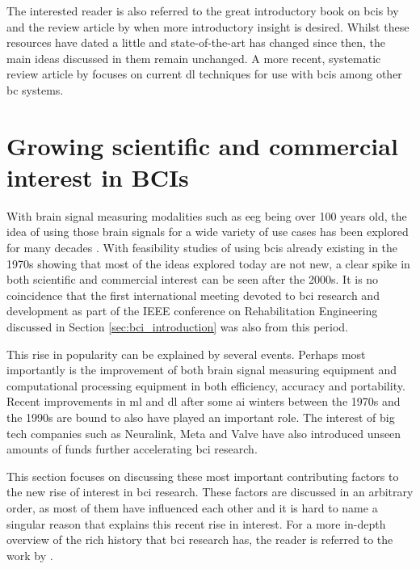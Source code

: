 The interested reader is also referred to the great introductory book on \glspl{bci} by \citet{bci_book} and the review article by \citet{bci_review} when more introductory insight is desired.
Whilst these resources have dated a little and state-of-the-art has changed since then, the main ideas discussed in them remain unchanged.
A more recent, systematic review article by \citet{bci_review_arnau} focuses on current \gls{dl} techniques for use with \glspl{bci} among other \gls{bc} systems.



\section{Growing scientific and commercial interest in BCIs}
\label{sec:bci_gaining_popularity}

With brain signal measuring modalities such as \gls{eeg} being over 100 years old, the idea of using those brain signals for a wide variety of use cases has been explored for many decades \citep{human_eeg_discovery, first_eeg, bci_history}.
With feasibility studies of using \glspl{bci} already existing in the 1970s \citep[for example by][]{early_bci} showing that most of the ideas explored today are not new, a clear spike in both scientific and commercial interest can be seen after the 2000s.
It is no coincidence that the first international meeting devoted to \gls{bci} research and development as part of the IEEE conference on Rehabilitation Engineering discussed in Section \ref{sec:bci_introduction} was also from this period.

This rise in popularity can be explained by several events.
Perhaps most importantly is the improvement of both brain signal measuring equipment and computational processing equipment in both efficiency, accuracy and portability.
Recent improvements in \gls{ml} and \gls{dl} after some \gls{ai} winters between the 1970s and the 1990s are bound to also have played an important role.
The interest of big tech companies such as Neuralink, Meta and Valve have also introduced unseen amounts of funds further accelerating \gls{bci} research.

This section focuses on discussing these most important contributing factors to the new rise of interest in \gls{bci} research.
These factors are discussed in an arbitrary order, as most of them have influenced each other and it is hard to name a singular reason that explains this recent rise in interest.
For a more in-depth overview of the rich history that \gls{bci} research has, the reader is referred to the work by \citet{bci_history}.

